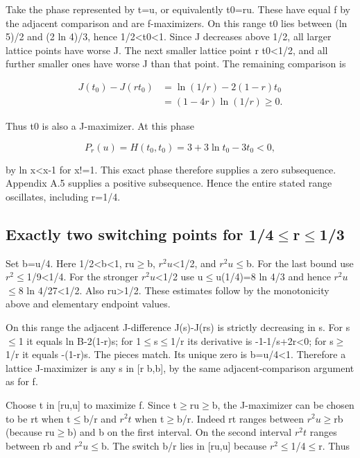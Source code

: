 \documentclass[11pt]{article}
\begin{document}
Take the phase represented by t=u, or equivalently t0=ru. These have equal f by the adjacent comparison and are f-maximizers. On this range t0 lies between (ln 5)/2 and (2 ln 4)/3, hence 1/2<t0<1. Since J decreases above 1/2, all larger lattice points have worse J. The next smaller lattice point r t0<1/2, and all further smaller ones have worse J than that point. The remaining comparison is

\[
\begin{aligned}J(t_0)-J(rt_0)&=\ln(1/r)-2(1-r)t_0\\&=(1-4r)\ln(1/r)\geq0.\end{aligned}
\]

Thus t0 is also a J-maximizer. At this phase

\[
P_r(u)=H(t_0,t_0)=3+3\ln t_0-3t_0<0,
\]

by ln x<x-1 for x!=1. This exact phase therefore supplies a zero subsequence. Appendix A.5 supplies a positive subsequence. Hence the entire stated range oscillates, including r=1/4.

\subsection{Exactly two switching points for 1/4\ensuremath{\leq}r\ensuremath{\leq}1/3}

Set b=u/4. Here 1/2<b<1, ru\ensuremath{\geq}b, $r^2u$<1/2, and $r^2u$\ensuremath{\leq}b. For the last bound use $r^{2}$\ensuremath{\leq}1/9<1/4. For the stronger $r^2u$<1/2 use u\ensuremath{\leq}u(1/4)=8 ln 4/3 and hence $r^2u$\ensuremath{\leq}8 ln 4/27<1/2. Also ru>1/2. These estimates follow by the monotonicity above and elementary endpoint values.

On this range the adjacent J-difference J(s)-J(rs) is strictly decreasing in s. For s\ensuremath{\leq}1 it equals ln B-2(1-r)s; for 1\ensuremath{\leq}s\ensuremath{\leq}1/r its derivative is -1-1/s+2r<0; for s\ensuremath{\geq}1/r it equals -(1-r)s. The pieces match. Its unique zero is b=u/4<1. Therefore a lattice J-maximizer is any s in [r b,b], by the same adjacent-comparison argument as for f.

Choose t in [ru,u] to maximize f. Since t\ensuremath{\geq}ru\ensuremath{\geq}b, the J-maximizer can be chosen to be rt when t\ensuremath{\leq}b/r and $r^2t$ when t\ensuremath{\geq}b/r. Indeed rt ranges between $r^2u$\ensuremath{\geq}rb (because ru\ensuremath{\geq}b) and b on the first interval. On the second interval $r^2t$ ranges between rb and $r^2u$\ensuremath{\leq}b. The switch b/r lies in [ru,u] because $r^{2}$\ensuremath{\leq}1/4\ensuremath{\leq}r. Thus
\end{document}

